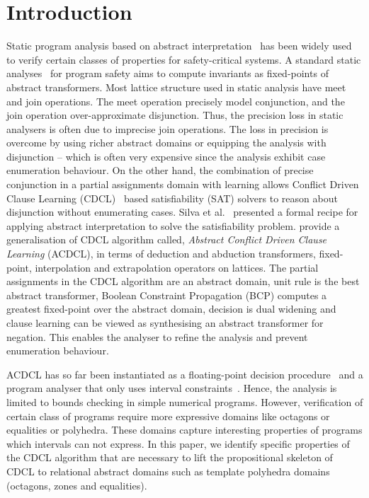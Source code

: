 \section{Introduction}

%
Static program analysis based on abstract interpretation~\cite{CC77} has
been widely used to verify certain classes of properties for safety-critical
systems.  A standard static analyses~\cite{se2011} for program safety aims
to compute invariants as fixed-points of abstract transformers.  Most
lattice structure used in static analysis have meet and join operations. 
The meet operation precisely model conjunction, and the join operation
over-approximate disjunction.  Thus, the precision loss in static analysers
is often due to imprecise join operations.  The loss in precision is
overcome by using richer abstract domains or equipping the analysis with
disjunction -- which is often very expensive since the analysis exhibit case
enumeration behaviour.
%
%
On the other hand, the combination of precise conjunction in a partial
assignments domain with learning allows Conflict Driven Clause Learning
(CDCL)~\cite{cdcl} based satisfiability (SAT) solvers to reason about
disjunction without enumerating cases.  Silva et al.~\cite{tacas12, sas12,
dhk2013-popl} presented a formal recipe for applying abstract interpretation
to solve the satisfiability problem.  \cite{dhk2013-popl} provide a
generalisation of CDCL algorithm called, {\em Abstract Conflict Driven
Clause Learning} (ACDCL), in terms of deduction and abduction transformers,
fixed-point, interpolation and extrapolation operators on lattices.  The
partial assignments in the CDCL algorithm are an abstract domain, unit rule
is the best abstract transformer, Boolean Constraint Propagation (BCP)
computes a greatest fixed-point over the abstract domain, decision is dual
widening and clause learning can be viewed as synthesising an abstract
transformer for negation.
%
This enables the
analyser to refine the analysis and prevent enumeration behaviour.

ACDCL has so far been instantiated as a floating-point decision
procedure~\cite{DBLP:journals/fmsd/BrainDGHK14} and a program analyser that
only uses interval constraints~\cite{tacas12}.  Hence, the analysis is
limited to bounds checking in simple numerical programs.  However,
verification of certain class of programs require more expressive domains
like octagons or equalities or polyhedra.  These domains capture interesting
properties of programs which intervals can not express.  In this paper, we
identify specific properties of the CDCL algorithm that are necessary to
lift the propositional skeleton of CDCL to relational abstract domains such
as template polyhedra domains~\cite{sriram} (octagons, zones and
equalities).  
